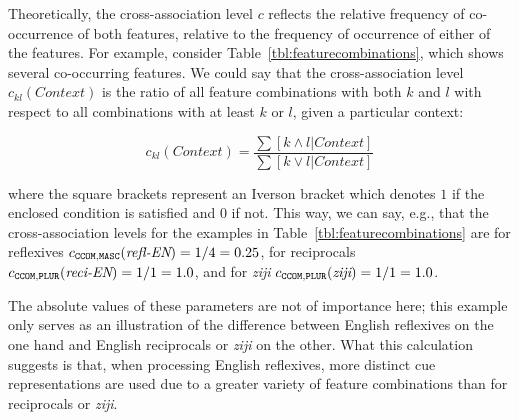 \documentclass{cambridge7A}\usepackage[]{graphicx}\usepackage[]{color}
\newcommand{\actrcue}[1]{\texttt{\uppercase{#1}}}
\begin{document}
Theoretically, the   cross-association level $c$ reflects the
relative frequency of co-occurrence of both features, relative to the frequency of occurrence of either of the features. For example, consider 
Table~\ref{tbl:featurecombinations}, which shows several co-occurring features. 
We could say that the cross-association level $c_{kl}(Context)$ is the ratio of all feature combinations with both $k$ and $l$ with respect to all combinations with at least $k$ or $l$, given a particular context:

\begin{equation}
	\label{eq:cmetric}
	c_{kl}(Context) = \frac{\sum{[k \land l | Context]}}{\sum{[k \lor l | Context]}} 
\end{equation}

where the square brackets represent an Iverson bracket which denotes $1$ if the enclosed condition is satisfied and $0$ if not.
This way, we can say, e.g., that the cross-association levels for the examples in Table~\ref{tbl:featurecombinations} are for reflexives $c_{\actrcue{ccom},\actrcue{masc}}(\textit{refl-EN}) = 1/4 = 0.25$, for reciprocals $c_{\actrcue{ccom},\actrcue{plur}}(\textit{reci-EN}) = 1/1 = 1.0$, and for \textit{ziji} $c_{\actrcue{ccom},\actrcue{plur}}(\textit{ziji}) = 1/1 = 1.0$.

The absolute values of these parameters are not of importance here; this example only serves as an illustration of the difference between English reflexives on the one hand and English reciprocals or \textit{ziji} on the other.
What this calculation suggests is that, when processing English reflexives, more distinct cue representations are used due to a greater variety of feature combinations than for reciprocals or \textit{ziji}.
\end{document}
